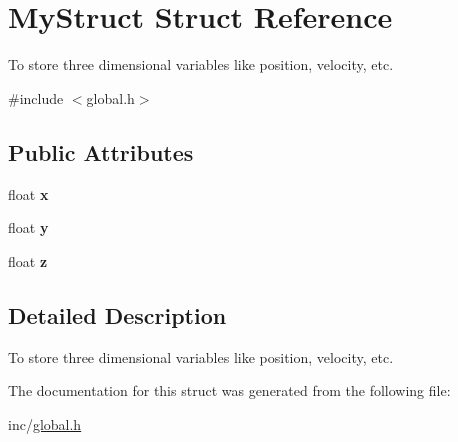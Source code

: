 \hypertarget{struct_my_struct}{\section{My\-Struct Struct Reference}
\label{struct_my_struct}
}


To store three dimensional variables like position, velocity, etc.  




{\ttfamily \#include $<$global.\-h$>$}

\subsection*{Public Attributes}
\begin{DoxyCompactItemize}
\item 
\hypertarget{struct_my_struct_a0c0d6e6937ab6505bf2817eef16bafa2}{float {\bfseries x}}\label{struct_my_struct_a0c0d6e6937ab6505bf2817eef16bafa2}

\item 
\hypertarget{struct_my_struct_a4381bcca4cdb943bcad32c16b8686360}{float {\bfseries y}}\label{struct_my_struct_a4381bcca4cdb943bcad32c16b8686360}

\item 
\hypertarget{struct_my_struct_acd337c48a608e0f573826d80a337646d}{float {\bfseries z}}\label{struct_my_struct_acd337c48a608e0f573826d80a337646d}

\end{DoxyCompactItemize}


\subsection{Detailed Description}
To store three dimensional variables like position, velocity, etc. 

The documentation for this struct was generated from the following file\-:\begin{DoxyCompactItemize}
\item 
inc/\hyperlink{global_8h}{global.\-h}\end{DoxyCompactItemize}

